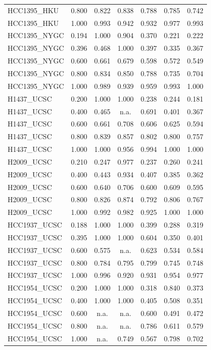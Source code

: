 \documentclass[pdflatex,sn-nature]{sn-jnl}
\begin{document}
\begin{small}
\begin{longtable}{@{}llccccc@{}}
  HCC1395\_HKU & 0.800 & 0.822 & 0.838 & 0.788 & 0.785 & 0.742 \\
  HCC1395\_HKU & 1.000 & 0.993 & 0.942 & 0.932 & 0.977 & 0.993 \\
  \addlinespace
  HCC1395\_NYGC & 0.194 & 1.000 & 0.904 & 0.370 & 0.221 & 0.222 \\
  HCC1395\_NYGC & 0.396 & 0.468 & 1.000 & 0.397 & 0.335 & 0.367 \\
  HCC1395\_NYGC & 0.600 & 0.661 & 0.679 & 0.598 & 0.572 & 0.549 \\
  HCC1395\_NYGC & 0.800 & 0.834 & 0.850 & 0.788 & 0.735 & 0.704 \\
  HCC1395\_NYGC & 1.000 & 0.989 & 0.939 & 0.959 & 0.993 & 1.000 \\
  \addlinespace
  H1437\_UCSC & 0.200 & 1.000 & 1.000 & 0.238 & 0.244 & 0.181 \\
  H1437\_UCSC & 0.400 & 0.465 & n.a. & 0.691 & 0.401 & 0.367 \\
  H1437\_UCSC & 0.600 & 0.661 & 0.708 & 0.606 & 0.625 & 0.594 \\
  H1437\_UCSC & 0.800 & 0.839 & 0.857 & 0.802 & 0.800 & 0.757 \\
  H1437\_UCSC & 1.000 & 1.000 & 0.956 & 0.994 & 1.000 & 1.000 \\
  \addlinespace
  H2009\_UCSC & 0.210 & 0.247 & 0.977 & 0.237 & 0.260 & 0.241 \\
  H2009\_UCSC & 0.400 & 0.443 & 0.934 & 0.407 & 0.385 & 0.362 \\
  H2009\_UCSC & 0.600 & 0.640 & 0.706 & 0.600 & 0.609 & 0.595 \\
  H2009\_UCSC & 0.800 & 0.826 & 0.874 & 0.792 & 0.806 & 0.767 \\
  H2009\_UCSC & 1.000 & 0.992 & 0.982 & 0.925 & 1.000 & 1.000 \\
  \addlinespace
  HCC1937\_UCSC & 0.188 & 1.000 & 1.000 & 0.399 & 0.288 & 0.319 \\
  HCC1937\_UCSC & 0.395 & 1.000 & 1.000 & 0.604 & 0.350 & 0.401 \\
  HCC1937\_UCSC & 0.600 & 0.575 & n.a. & 0.623 & 0.534 & 0.584 \\
  HCC1937\_UCSC & 0.800 & 0.784 & 0.795 & 0.799 & 0.745 & 0.748 \\
  HCC1937\_UCSC & 1.000 & 0.996 & 0.920 & 0.931 & 0.954 & 0.977 \\
  \addlinespace
  HCC1954\_UCSC & 0.200 & 1.000 & 1.000 & 0.318 & 0.840 & 0.373 \\
  HCC1954\_UCSC & 0.400 & 1.000 & 1.000 & 0.405 & 0.508 & 0.351 \\
  HCC1954\_UCSC & 0.600 & n.a. & n.a. & 0.600 & 0.491 & 0.472 \\
  HCC1954\_UCSC & 0.800 & n.a. & n.a. & 0.786 & 0.611 & 0.579 \\
  HCC1954\_UCSC & 1.000 & n.a. & 0.749 & 0.567 & 0.798 & 0.702 \\
\end{longtable}
\end{small}
\end{document}
